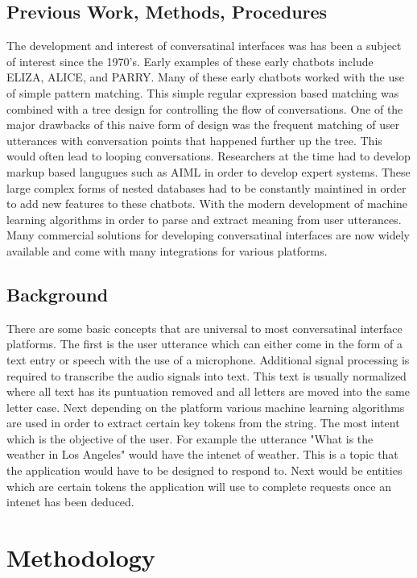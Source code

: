 \documentclass[9pt,software]{livecoms}
\begin{document}
\subsection{Previous Work, Methods, Procedures}
The development and interest of conversatinal interfaces was has been a subject of interest since the 1970's. Early examples of these
early chatbots include ELIZA, ALICE, and PARRY. Many of these early chatbots worked with the use of simple pattern matching. This simple 
regular expression based matching was combined with a tree design for controlling the flow of conversations. One of the major drawbacks of 
this naive form of design was the frequent matching of user utterances with conversation points that happened further up the tree. This 
would often lead to looping conversations. Researchers at the time had to develop markup based langugues such as AIML in order to develop 
expert systems. These large complex forms of nested databases had to be constantly maintined in order to add new features to these chatbots. 
With the modern development of machine learning algorithms in order to parse and extract meaning from user utterances. Many commercial solutions
for developing conversatinal interfaces are now widely available and come with many integrations for various platforms.

\subsection{Background}
There are some basic concepts that are universal to most conversatinal interface platforms. The first is the user utterance which can either come in 
the form of a text entry or speech with the use of a microphone. Additional signal processing is required to transcribe the audio signals into text. 
This text is usually normalized where all text has its puntuation removed and all letters are moved into the same letter case. Next depending on the 
platform various machine learning algorithms are used in order to extract certain key tokens from the string. The most intent which is the objective
of the user. For example the utterance "What is the weather in Los Angeles" would have the intenet of weather. This is a topic that the application
would have to be designed to respond to. Next would be entities which are certain tokens the application will use to complete requests once an intenet
has been deduced.

\section{Methodology}
\end{document}
